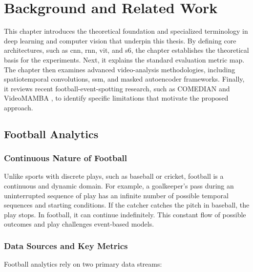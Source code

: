 \chapter{Background and Related Work}
\label{chap:background}

This chapter introduces the theoretical foundation and specialized terminology in deep learning and computer vision that underpin this thesis. By defining core architectures, such as \acrfull{cnn}, \acrfull{rnn}, \acrfull{vit}, and \acrfull{s6}, the chapter establishes the theoretical basis for the experiments. Next, it explains the standard evaluation metric \acrfull{map}. The chapter then examines advanced video-analysis methodologies, including spatiotemporal convolutions, \acrfull{ssm}, and masked autoencoder frameworks. Finally, it reviews recent football-event-spotting research, such as COMEDIAN \cite{denize_comedian_2024} and VideoMAMBA \cite{li_videomamba_2024}, to identify specific limitations that motivate the proposed approach.

\section{Football Analytics}
\label{sec:football_analytics}

\subsection{Continuous Nature of Football}
Unlike sports with discrete plays, such as baseball or cricket, football is a continuous and dynamic domain. For example, a goalkeeper's pass during an uninterrupted sequence of play has an infinite number of possible temporal sequences and starting conditions. If the catcher catches the pitch in baseball, the play stops. In football, it can continue indefinitely. This constant flow of possible outcomes and play challenges event-based models. 


\subsection{Data Sources and Key Metrics}
Football analytics rely on two primary data streams:

